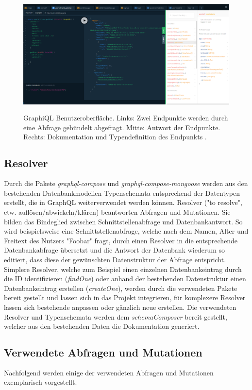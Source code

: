 \begin{figure}
	\centering
    \includegraphics[width=\textwidth]{sources/graphiql.png}\cite{}
	\caption{GraphiQL Benutzeroberfläche. Links: Zwei Endpunkte werden durch eine Abfrage gebündelt abgefragt. Mitte: Antwort der Endpunkte. Rechts: Dokumentation und Typendefinition des Endpunkts .}
	\label{fig1}
\end{figure}

\subsection{Resolver}
Durch die Pakete \textit{graphql-compose} und \textit{graphql-compose-mongoose} werden aus den bestehenden Datenbankmodellen Typenschemata entsprechend der Datentypen erstellt, die in GraphQL weiterverwendet werden können. 
Resolver ("to resolve", etw. auflösen/abwickeln/klären) beantworten Abfragen und Mutationen. Sie bilden das Bindeglied zwischen Schnittstellenabfrage und Datenbankantwort. So wird beispielsweise eine Schnittstellenabfrage, welche nach dem Namen, Alter und Freitext des Nutzers "Foobar" fragt, durch einen Resolver in die entsprechende Datenbankabfrage übersetzt und die Antwort der Datenbank wiederum so editiert, dass diese der gewünschten Datenstruktur der Abfrage entspricht. Simplere Resolver, welche zum Beispiel einen einzelnen Datenbankeintrag durch die ID identifizieren (\textit{findOne}) oder anhand der bestehenden Datenstruktur einen Datenbankeintrag erstellen (\textit{createOne}), werden durch die verwendeten Pakete bereit gestellt und lassen sich in das Projekt integrieren, für komplexere Resolver lassen sich bestehende anpassen oder gänzlich neue erstellen.
Die verwendeten Resolver und Typenschemata werden dem \textit{schemaComposer} bereit gestellt, welcher aus den bestehenden Daten die Dokumentation generiert.


\subsection{Verwendete Abfragen und Mutationen}
Nachfolgend werden einige der verwendeten Abfragen und Mutationen exemplarisch vorgestellt.

